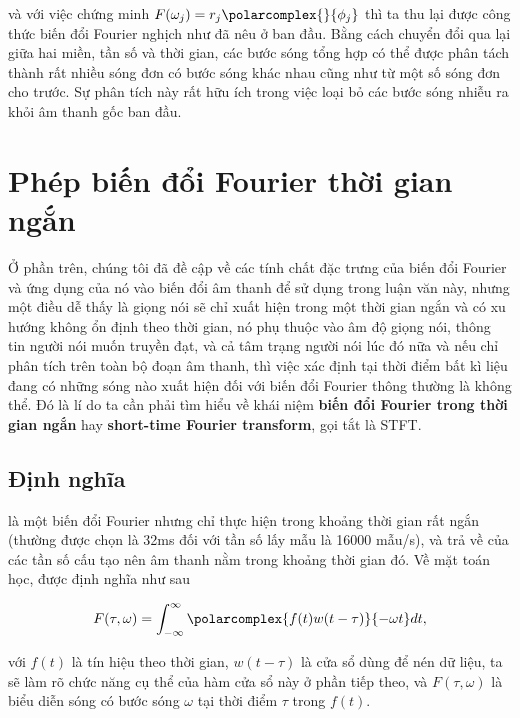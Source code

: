 		\noindent và với việc chứng minh $F(\omega_j) = r_j\polarcomplex{}{\phi_j}$ thì ta thu lại được công thức biến đổi Fourier nghịch như đã nêu ở ban đầu. Bằng cách chuyển đổi qua lại giữa hai miền, tần số và thời gian, các bước sóng tổng hợp có thể được phân tách thành rất nhiều sóng đơn có bước sóng khác nhau cũng như từ một số sóng đơn cho trước. Sự phân tích này rất hữu ích trong việc loại bỏ các bước sóng nhiễu ra khỏi âm thanh gốc ban đầu.
		
	
\section{Phép biến đổi Fourier thời gian ngắn}\label{section::signal_processing::stft}
	
	Ở phần trên, chúng tôi đã đề cập về các tính chất đặc trưng của biến đổi Fourier và ứng dụng của nó vào biến đổi âm thanh để sử dụng trong luận văn này, nhưng một điều dễ thấy là giọng nói sẽ chỉ xuất hiện trong một thời gian ngắn và có xu hướng không ổn định theo thời gian, nó phụ thuộc vào âm độ giọng nói, thông tin người nói muốn truyền đạt, và cả tâm trạng người nói lúc đó nữa và nếu chỉ phân tích trên toàn bộ đoạn âm thanh, thì việc xác định tại thời điểm bất kì liệu đang có những sóng nào xuất hiện đối với biến đổi Fourier thông thường là không thể. Đó là lí do ta cần phải tìm hiểu về khái niệm \textbf{biến đổi Fourier trong thời gian ngắn} hay \textbf{short-time Fourier transform}, gọi tắt là STFT.

	\subsection{Định nghĩa}\label{subsection::signal_processing::stft::def}
	
		 là một biến đổi Fourier nhưng chỉ thực hiện trong khoảng thời gian rất ngắn (thường được chọn là 32ms đối với tần số lấy mẫu là 16000 mẫu/s), và trả về \spectrum{} của các tần số cấu tạo nên âm thanh nằm trong khoảng thời gian đó. Về mặt toán học,  được định nghĩa như sau
		
			\begin{equation}
				F(\tau, \omega) = \int_{-\infty}^{\infty} \polarcomplex{f(t) w(t - \tau)}{-\omega t}dt,
			\label{stft::formula}
			\end{equation}
		
		\noindent với $f(t)$ là tín hiệu theo thời gian, $w(t - \tau)$ là cửa sổ dùng để nén dữ liệu, ta sẽ làm rõ chức năng cụ thể của hàm cửa sổ này ở phần tiếp theo, và $F(\tau, \omega)$ là biểu diễn sóng có bước sóng $\omega$ tại thời điểm $\tau$ trong $f(t)$.
		
